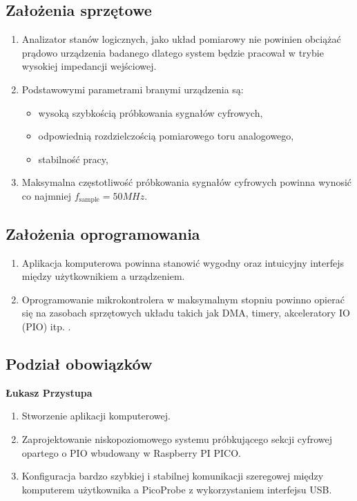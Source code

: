 \subsection{Założenia sprzętowe}
    \begin{enumerate}
        \item Analizator stanów logicznych, jako układ pomiarowy nie powinien obciążać prądowo
        urządzenia badanego dlatego system będzie pracował w trybie
        wysokiej impedancji wejściowej.
        \item Podstawowymi parametrami branymi urządzenia są:
        \begin{itemize}
            \item wysoką szybkością próbkowania sygnałów cyfrowych,
            \item odpowiednią rozdzielczością pomiarowego toru analogowego,
            \item stabilność pracy,
        \end{itemize}
        \item Maksymalna częstotliwość próbkowania sygnałów cyfrowych powinna wynosić co najmniej $f_{\text{sample}} = 50MHz$.
    \end{enumerate}

\subsection{Założenia oprogramowania}
    \begin{enumerate}
        \item Aplikacja komputerowa powinna stanowić wygodny oraz intuicyjny interfejs
        między użytkownikiem a urządzeniem.
        \item Oprogramowanie mikrokontrolera w maksymalnym stopniu powinno opierać się na
        zasobach sprzętowych układu takich jak DMA, timery, akceleratory IO (PIO) itp. .
    \end{enumerate}

\subsection{Podział obowiązków}
    \textbf{Łukasz Przystupa}
    \begin{enumerate}
        \item Stworzenie aplikacji komputerowej.
        \item Zaprojektowanie niskopoziomowego systemu próbkującego sekcji cyfrowej opartego o PIO wbudowany w Raspberry PI PICO.
        \item Konfiguracja bardzo szybkiej i stabilnej komunikacji szeregowej między
        komputerem użytkownika a PicoProbe z wykorzystaniem interfejsu USB.
    \end{enumerate}

